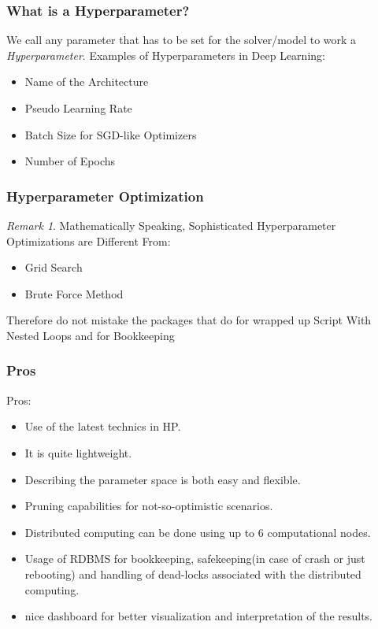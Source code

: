 \documentclass{beamer}
\theoremstyle{definition}
\theoremstyle{remark}
\newtheorem {Rem} [Thm]{Remark}
\begin{document}
\begin{frame}
  \frametitle{What is a Hyperparameter?}
  \pause
  We call any parameter that has to be set for the solver/model to work a \emph{Hyperparameter}.
  \newline
  \newline
\pause  
Examples of Hyperparameters in Deep Learning:
\begin{itemize}
  \pause  
  \item Name of the Architecture   
  \pause  
  \item Pseudo Learning Rate
  \pause  
  \item Batch Size for SGD-like Optimizers
  \pause  
  \item Number of Epochs
\end{itemize}
\end{frame}
\begin{frame}
  \frametitle{Hyperparameter Optimization}
  \pause
  \begin{Rem}
    \pause
    Mathematically Speaking, Sophisticated Hyperparameter Optimizations are Different From:
    \begin{itemize}
      \pause
      \item Grid Search
      \pause
      \item Brute Force Method
    \end{itemize}    
  \end{Rem}
    \pause
    Therefore do not mistake the packages that do \ho for wrapped up \bash Script With Nested Loops and
    \awk for Bookkeeping
\end{frame}

\begin{frame}
  \frametitle{\optuna Pros}
  \pause
  Pros:
  \begin{itemize}
    \pause
    \item Use of the latest technics in \ac{HP}\cite{Hutter2019}\cite{Akiba2019}.
    \pause
    \item It is quite lightweight.
    \pause
    \item Describing the parameter space is both easy and flexible.
    \pause
    \item Pruning capabilities for not-so-optimistic scenarios.
    \pause
    \item Distributed computing can be done using up to 6 computational nodes.
    \pause
    \item Usage of \ac{RDBMS} for bookkeeping, safekeeping(in case of crash or just rebooting) and handling of dead-locks associated with the distributed computing.
    \pause
    \item nice dashboard for better visualization and interpretation of the results.  
  \end{itemize}
\end{frame}
\end{document}
